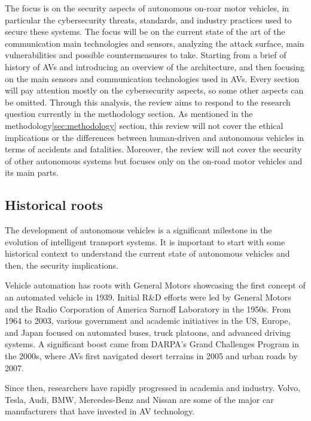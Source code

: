 The focus is on the security aspects of autonomous on-roar motor vehicles,
in particular the cybersecurity threats, standards, and industry practices used to secure these systems.
The focus will be on the current state of the art of the communication main technologies and sensors,
analyzing the attack surface, main vulnerabilities and possible countermeasures to take.
Starting from a brief of history of AVs and introducing an overview of the architecture, and then focusing on the main sensors and communication technologies used in AVs.
Every section will pay attention mostly on the cybersecurity aspects, so some other aspects can be omitted.
Through this analysis, the review aims to respond to the research question currently in the methodology section.
As mentioned in the methodology\ref{sec:methodology} section, this review will not cover the ethical implications or the differences between human-driven and autonomous vehicles in terms of accidents and fatalities.
Moreover, the review will not cover the security of other autonomous systems
but focuses only on the on-road motor vehicles and its main parts.

\subsection{Historical roots}\label{subsec:historical-roots}

The development of autonomous vehicles is a significant milestone in the evolution of intelligent transport systems.
It is important to start with some historical context to understand the current state of autonomous vehicles and then,
the security implications.

Vehicle automation has roots with General Motors showcasing the first concept of an automated vehicle in 1939.
Initial R\&D efforts were led by General Motors and the Radio Corporation of America Sarnoff Laboratory in the 1950s.
From 1964 to 2003, various government and academic initiatives in the US, Europe,
and Japan focused on automated buses, truck platoons, and advanced driving systems\cite{pendleton2017perception, shladover2017connected}.
A significant boost came from DARPA’s Grand Challenges Program in the 2000s\cite{darpa_grand_challenges_book},
where AVs first navigated desert terrains in 2005 and urban roads by 2007\cite{pendleton2017perception, shladover2017connected}.

Since then, researchers have rapidly progressed in academia and industry.
Volvo, Tesla, Audi, BMW,
Mercedes-Benz and Nissan are some of the major car manufacturers that have invested in AV technology\cite{faisal2019understanding}.


